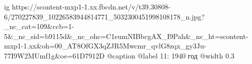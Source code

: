  
 
 
 
 

\ifcmt
  ig https://scontent-mxp1-1.xx.fbcdn.net/v/t39.30808-6/270227839_10226583944814771_5032300451998108178_n.jpg?_nc_cat=109&ccb=1-5&_nc_sid=b9115d&_nc_ohc=C1eumNIBbcgAX_I9Pah&_nc_ht=scontent-mxp1-1.xx&oh=00_AT8OfGX3qZJR5Mwcmr_qvlG8zqx_gy3Ju-77I9W2MUmf1g&oe=61D7912D
	@caption @label 11: 1940 год
  @width 0.3
\fi

